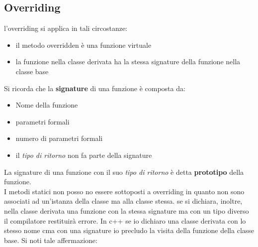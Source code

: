 \subsection{Overriding}

l'overriding si applica in tali circostanze:
\begin{itemize}
    \item il metodo overridden è una funzione virtuale
    \item la funzione nella classe derivata ha la stessa signature della funzione nella classe base
\end{itemize}

Si ricorda che la \textbf{signature} di una funzione è composta da:
\begin{itemize}
    \item Nome della funzione
    \item parametri formali
    \item numero di parametri formali
    \item il \textit{tipo di ritorno} non fa parte della signature
\end{itemize}

La signature di una funzione con il suo \textit{tipo di ritorno} è detta \textbf{prototipo} della funzione. \\
I metodi statici non posso no essere sottoposti a overriding in quanto non sono associati ad un'istanza della classe ma alla classe stessa. se si dichiara, inoltre, nella classe derivata una funzione con la stessa signature ma con un tipo diverso il compilatore restituirà errore. In c++ se io dichiaro una classe derivata con lo stesso nome cma con una signature io precludo la visita della funzione della classe base. Si noti tale affermazione:



